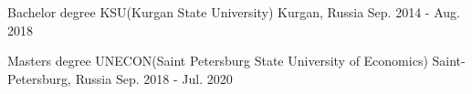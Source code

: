 

\begin{cventries}

  \cventry
    {Bachelor degree} %
    {KSU(Kurgan State University)} %
    {Kurgan, Russia} %
    {Sep. 2014 - Aug. 2018} %
    {}

  \cventry
    {Masters degree} %
    {UNECON(Saint Petersburg State University of Economics)} %
    {Saint-Petersburg, Russia} %
    {Sep. 2018 - Jul. 2020} %
    {}
\end{cventries}
